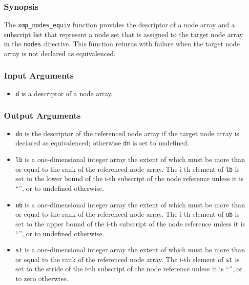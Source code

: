 \subsubsection*{Synopsis}

The {\tt xmp\_nodes\_equiv} function provides the descriptor of a node
array and a subscript list that represent a node set that is 
assigned to the target node array in the {\tt nodes} directive. This
function returns with failure when the target node array is not declared
as equivalenced.

\subsubsection*{Input Arguments}
\begin{itemize}
 \item {\tt d} is a descriptor of a node array.
\end{itemize}

\subsubsection*{Output Arguments}
\begin{itemize}
 \item {\tt dn} is the descriptor of the referenced node array
       if the target node array is declared as equivalenced; otherwise
       {\tt dn} is set to undefined.
 \item {\tt lb} is a one-dimensional integer array the extent of which
       must be more than or equal to the rank of the referenced node
       array. The i-th element of {\tt lb} is set to the lower bound of
       the i-th subscript of the node reference unless it is ``{\tt *}'',
       or to undefined otherwise.
 \item {\tt ub} is a one-dimensional integer array the extent of which
       must be more than or equal to the rank of the referenced node
       array. The i-th element of {\tt ub} is set to the upper bound of
       the i-th subscript of the node reference unless it is ``{\tt *}'',
       or to undefined otherwise.
 \item {\tt st} is a one-dimensional integer array the extent of which
       must be more than or equal to the rank of the referenced node
       array. The i-th element of {\tt st} is set to the stride of
       the i-th subscript of the node reference unless it is ``{\tt *}'',
       or to zero otherwise.
\end{itemize}


